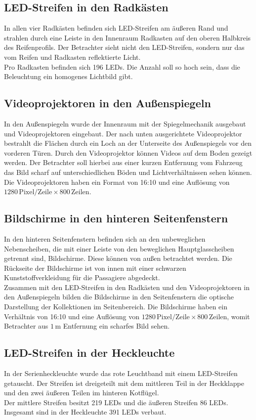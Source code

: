 \subsection{LED-Streifen in den Radkästen}
In allen vier Radkästen befinden sich LED-Streifen am äußeren Rand und strahlen durch eine Leiste in den Innenraum Radkasten auf den oberen Halbkreis des Reifenprofils. Der Betrachter sieht nicht den LED-Streifen, sondern nur das vom Reifen und Radkasten reflektierte Licht. \\
Pro Radkasten befinden sich 196 LEDs. Die Anzahl soll so hoch sein, dass die Beleuchtung ein homogenes Lichtbild gibt.
\subsection{Videoprojektoren in den Außenspiegeln}
In den Außenspiegeln wurde der Innenraum mit der Spiegelmechanik ausgebaut und Videoprojektoren eingebaut. Der nach unten ausgerichtete Videoprojektor bestrahlt die Flächen durch ein Loch an der Unterseite des Außenspiegels vor den vorderen Türen.
Durch den Videoprojektor können Videos auf dem Boden gezeigt werden. Der Betrachter soll hierbei aus einer kurzen Entfernung vom Fahrzeug das Bild scharf auf unterschiedlichen Böden und Lichtverhältnissen sehen können. \\
Die Videoprojektoren haben ein Format von 16:10 und eine Auflösung von $ 1280\,\mathrm{Pixel}/\mathrm{Zeile} \times 800\,\mathrm{Zeilen} $.
\subsection{Bildschirme in den hinteren Seitenfenstern}
In den hinteren Seitenfenstern befinden sich an den unbeweglichen Nebenscheiben, die mit einer Leiste von den beweglichen Hauptglasscheiben getrennt sind, Bildschirme. Diese können von außen betrachtet werden. Die Rückseite der Bildschirme ist von innen mit einer schwarzen Kunststoffverkleidung für die Passagiere abgedeckt.\\
Zusammen mit den LED-Streifen in den Radkästen und den Videoprojektoren in den Außenspiegeln bilden die Bildschirme in den Seitenfenstern die optische Darstellung der Kollektionen im Seitenbereich.
Die Bildschirme haben ein Verhältnis von 16:10 und eine Auflösung von $ 1280\,\mathrm{Pixel}/\mathrm{Zeile} \times 800 \,\mathrm{Zeilen} $, womit Betrachter aus $ 1\,\mathrm{m} $ Entfernung ein scharfes Bild sehen.
\subsection{LED-Streifen in der Heckleuchte}
In der Serienheckleuchte wurde das rote Leuchtband mit einem LED-Streifen getauscht. Der Streifen ist dreigeteilt mit dem mittleren Teil in der Heckklappe und den zwei äußeren Teilen im hinteren Kotflügel. \\
Der mittlere Streifen besitzt 219 LEDs und die äußeren Streifen 86 LEDs. Insgesamt sind in der Heckleuchte 391 LEDs verbaut.
